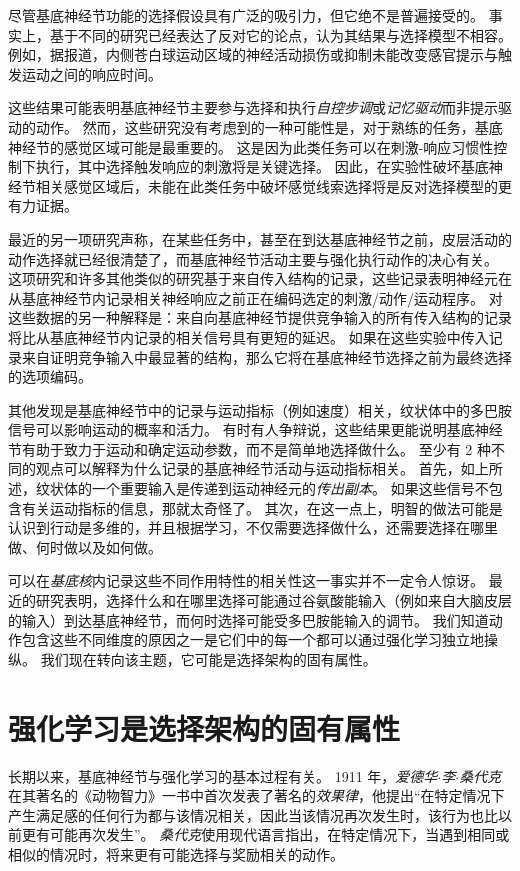 尽管基底神经节功能的选择假设具有广泛的吸引力，但它绝不是普遍接受的。
事实上，基于不同的研究已经表达了反对它的论点，认为其结果与选择模型不相容。
例如，据报道，内侧苍白球运动区域的神经活动损伤或抑制未能改变感官提示与触发运动之间的响应时间。


这些结果可能表明基底神经节主要参与选择和执行\textit{自控步调}或\textit{记忆驱动}而非提示驱动的动作。
然而，这些研究没有考虑到的一种可能性是，对于熟练的任务，基底神经节的感觉区域可能是最重要的。
这是因为此类任务可以在刺激-响应习惯性控制下执行，其中选择触发响应的刺激将是关键选择。
因此，在实验性破坏基底神经节相关感觉区域后，未能在此类任务中破坏感觉线索选择将是反对选择模型的更有力证据。


最近的另一项研究声称，在某些任务中，甚至在到达基底神经节之前，皮层活动的动作选择就已经很清楚了，而基底神经节活动主要与强化执行动作的决心有关。
这项研究和许多其他类似的研究基于来自传入结构的记录，这些记录表明神经元在从基底神经节内记录相关神经响应之前正在编码选定的刺激/动作/运动程序。
对这些数据的另一种解释是：来自向基底神经节提供竞争输入的所有传入结构的记录将比从基底神经节内记录的相关信号具有更短的延迟。
如果在这些实验中传入记录来自证明竞争输入中最显著的结构，那么它将在基底神经节选择之前为最终选择的选项编码。


其他发现是基底神经节中的记录与运动指标（例如速度）相关，纹状体中的多巴胺信号可以影响运动的概率和活力。
有时有人争辩说，这些结果更能说明基底神经节有助于致力于运动和确定运动参数，而不是简单地选择做什么。
至少有 2 种不同的观点可以解释为什么记录的基底神经节活动与运动指标相关。
首先，如上所述，纹状体的一个重要输入是传递到运动神经元的\textit{传出副本}。
如果这些信号不包含有关运动指标的信息，那就太奇怪了。
其次，在这一点上，明智的做法可能是认识到行动是多维的，并且根据学习，不仅需要选择做什么，还需要选择在哪里做、何时做以及如何做。


可以在\textit{基底核}内记录这些不同作用特性的相关性这一事实并不一定令人惊讶。
最近的研究表明，选择什么和在哪里选择可能通过谷氨酸能输入（例如来自大脑皮层的输入）到达基底神经节，而何时选择可能受多巴胺能输入的调节。
我们知道动作包含这些不同维度的原因之一是它们中的每一个都可以通过强化学习独立地操纵。
我们现在转向该主题，它可能是选择架构的固有属性。



\section{强化学习是选择架构的固有属性} \label{sec:38_7}

长期以来，基底神经节与强化学习的基本过程有关。
1911 年，\textit{爱德华$\cdot$李$\cdot$桑代克}在其著名的《动物智力》一书中首次发表了著名的\textit{效果律}，他提出“在特定情况下产生满足感的任何行为都与该情况相关，因此当该情况再次发生时，该行为也比以前更有可能再次发生”。
\textit{桑代克}使用现代语言指出，在特定情况下，当遇到相同或相似的情况时，将来更有可能选择与奖励相关的动作。


